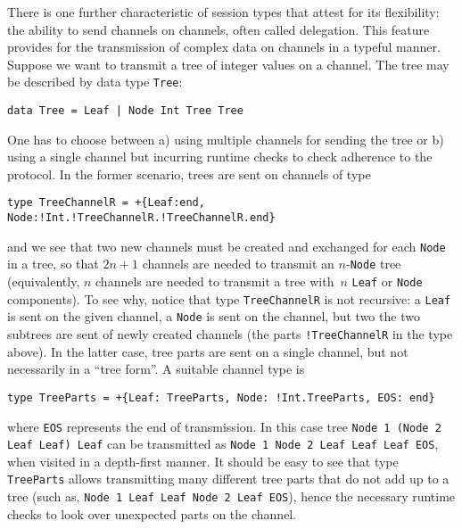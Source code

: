 There is one further characteristic of session types that attest for
its flexibility: the ability to send channels on channels, often
called delegation. This feature provides for the transmission of
complex data on channels in a typeful manner. Suppose we want to
transmit a tree of integer values on a channel. The tree may be
described by data type \lstinline|Tree|:
%
\begin{lstlisting}
data Tree = Leaf | Node Int Tree Tree
\end{lstlisting}

One has to choose between a) using multiple channels for
sending the tree or b) using a single channel but incurring runtime
checks to check adherence to the protocol. In the former scenario,
trees are sent on channels of type
%
\begin{lstlisting}[morekeywords=end]
type TreeChannelR = +{Leaf:end, Node:!Int.!TreeChannelR.!TreeChannelR.end}
\end{lstlisting}
%
and we see that two new channels must be created and exchanged for
each \lstinline|Node| in a tree, so that $2n+1$ channels are needed to
transmit an $n$-\lstinline|Node| tree (equivalently, $n$ channels are
needed to transmit a tree with~$n$ \lstinline|Leaf| or
\lstinline|Node| components).
%
To see why, notice that type \lstinline|TreeChannelR| is not
recursive: a \lstinline|Leaf| is sent on the given channel, a
\lstinline|Node| is sent on the channel, but two the two subtrees are
sent of newly created channels (the parts \lstinline|!TreeChannelR| in
the type above).
%
In the latter case, tree parts are sent on a single channel, but not
necessarily in a ``tree form''. A suitable channel type is
%
\begin{lstlisting}[morekeywords=end]
type TreeParts = +{Leaf: TreeParts, Node: !Int.TreeParts, EOS: end}
\end{lstlisting}
%
where \lstinline|EOS| represents the end of transmission. In this case
tree \lstinline|Node 1 (Node 2 Leaf Leaf) Leaf| can be transmitted as
\lstinline|Node 1 Node 2 Leaf Leaf Leaf EOS|, when visited in a
depth-first manner. It should be easy to see that type
\lstinline|TreeParts| allows transmitting many different tree parts
that do not add up to a tree (such as,
%
\lstinline|Node 1 Leaf Leaf Node 2 Leaf EOS|), hence the necessary
runtime checks to look over unexpected parts on the channel.

